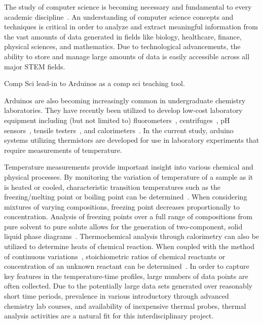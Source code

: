 The study of computer science is becoming necessary and fundamental to every academic discipline~\cite{columbia}.  
An understanding of computer science concepts and techniques is critical in order to analyze and 
extract meaningful information from the vast amounts of data generated in fields like biology, healthcare, 
finance, physical sciences, and mathematics.  Due to technological advancements, the ability to store and manage 
large amounts of data is easily accessible across all major STEM fields.  

Comp Sci lead-in to Arduinos as a comp sci teaching tool.  

Arduinos are also becoming increasingly common in undergraduate chemistry laboratories.  They have recently been 
utilized to develop low-cost laboratory equipment including (but not limited to) fluorometers~\cite{bullis}, 
centrifuges~\cite{sadegh}, 
pH sensors~\cite{qutieshat}, 
tensile testers~\cite{arrizabalaga}, and calorimeters~\cite{gomes}.  
In the current study, arduino systems utilizing 
thermistors are developed for use in laboratory experiments that require measurements of temperature.  

Temperature measurements provide important insight into various chemical and physical processes.  
By monitoring the variation of temperature of a sample as it is heated or cooled, characteristic 
transition temperatures such as the freezing/melting point or boiling point can be determined~\cite{atkins}.  
When considering mixtures of varying compositions, freezing point decreases proportionally to concentration.  
Analysis of freezing points over a full range of compositions from pure solvent to pure solute allows for the generation of 
two-component, solid liquid phase diagrams~\cite{martinez,blanchette}.  
Thermochemical analysis through calorimetry can also be utilized to 
determine heats of chemical reaction.  When coupled with the method of continuous variations~\cite{jobs}, stoichiometric 
ratios of chemical reactants or concentration of an unknown reactant can be determined~\cite{vernier,vonderbrink,tatsuoka,mahoney}.  
In order to capture key features in the temperature-time profiles, large numbers of data points are often collected.  
Due to the potentially large data sets generated over reasonably short time periods, prevalence in various introductory through 
advanced chemistry lab courses, and availability of inexpensive thermal probes, thermal analysis activities are a natural 
fit for this interdisciplinary project.




